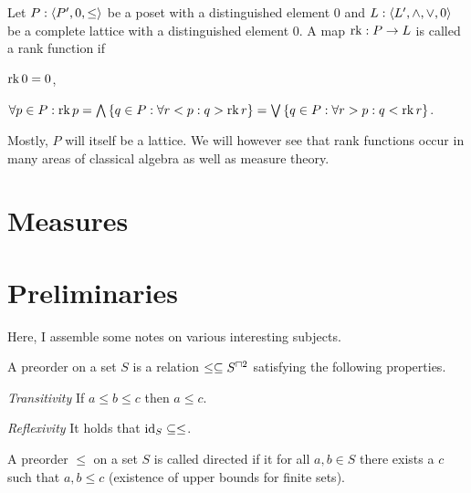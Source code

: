 \documentclass[8pt,a4paper]{article}
\begin{document}
\begin{definition}
    Let $P:\struct{P',0,\leq}$ be a poset with a distinguished element 0 and $L:\struct{L',\meet,\join,0}$ be a complete lattice with a distinguished element 0.
    A map $\mathop\mathrm{rk}:P\rightarrow L$ is called a rank function if
    \begin{properties}
            \item $\mathop\mathrm{rk}{0}=0$,
            \item $\forall p\in P: \rk{p}=\Meet\set{q\in P:\forall r<p: q>\rk{r}}=\Join\set{q\in P:\forall r>p: q<\rk{r}}$.
    \end{properties}
\end{definition}

\begin{remark}
    Mostly, $P$ will itself be a lattice. We will however see that rank functions occur in many areas of classical algebra as well as measure theory.
\end{remark}



\section{Measures}



\section{Preliminaries}

Here, I assemble some notes on various interesting subjects.

\begin{definition}[preorder]
    A preorder on a set $S$ is a relation $\leq\setleq S^{\setprod2}$ satisfying the following properties.
    \begin{statements}
            \item \emph{Transitivity} If $a\leq b\leq c$ then $a\leq c$.
            \item \emph{Reflexivity} It holds that $\mathop\mathrm{id}\nolimits_S\subseteq \leq$. 
    \end{statements}
\end{definition}

\begin{definition}[Directedness]
    A preorder $\leq$ on a set $S$ is called directed if it for all $a,b\in S$ there exists a $c$ such that $a,b\leq c$ (existence of upper bounds for finite sets).
\end{definition}
\end{document}
